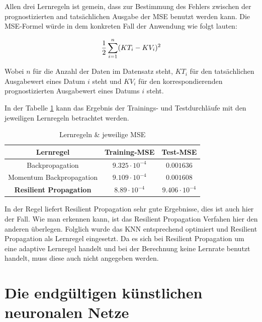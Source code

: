 Allen drei Lernregeln ist gemein, dass zur Bestimmung des Fehlers zwischen der prognostizierten and tatsächlichen Ausgabe der MSE benutzt werden kann. Die MSE-Formel würde in dem konkreten Fall der Anwendung wie folgt lauten:

\begin{equation}\formelentry{MSE zur Berechnung der Abweichung}
   \frac{1}{2}\sum^{n}_{i=1} (KT_{i} - KV_{i})^2
\end{equation}

Wobei $n$ für die Anzahl der Daten im Datensatz steht, $KT_i$ für den tatsächlichen Ausgabewert eines Datum $i$ steht und $KV_i$ für den korrespondierenden prognostizierten Ausgabewert eines Datums $i$ steht.

In der Tabelle \ref{tab:LERNregeln} kann das Ergebnis der Trainings- und Testdurchläufe mit den jeweiligen Lernregeln betrachtet werden.

\begin{table}[H]
  \centering
  \begin{tabular}{|c|c|c|}
  \hline 
  \rule[0ex]{0pt}{2.5ex} Lernregel & Training-MSE & Test-MSE \\ 
  \hline 
  \rule[0ex]{0pt}{2.5ex} Backpropagation & $9.325\cdot10^{-4}$ & $0.001636$ \\ 
  \hline 
  \rule[0ex]{0pt}{2.5ex} Momentum Backpropagation & $9.109\cdot10^{-4}$ & $0.001608$ \\ 
  \hline 
  \rule[0ex]{0pt}{2.5ex} \textbf{Resilient Propagation} & $8.89\cdot10^{-4}$ & $9.406\cdot10^{-4}$ \\ 
  \hline 
  \end{tabular} 
  \caption{Lernregeln \& jeweilige MSE}
  \label{tab:LERNregeln}
\end{table}

In der Regel liefert Resilient Propagation sehr gute Ergebnisse, dies ist auch hier der Fall. Wie man erkennen kann, ist das Resilient Propagation Verfahen  hier den anderen überlegen. Folglich wurde das KNN entsprechend optimiert und Resilient Propagation als Lernregel eingesetzt. Da es sich bei Resilient Propagation um eine adaptive Lernregel handelt und bei der Berechnung keine Lernrate benutzt handelt, muss diese auch nicht angegeben werden.

\section{Die endgültigen künstlichen neuronalen Netze}
\label{section:Die endgültigen künstlichen neuronalen Netze}

